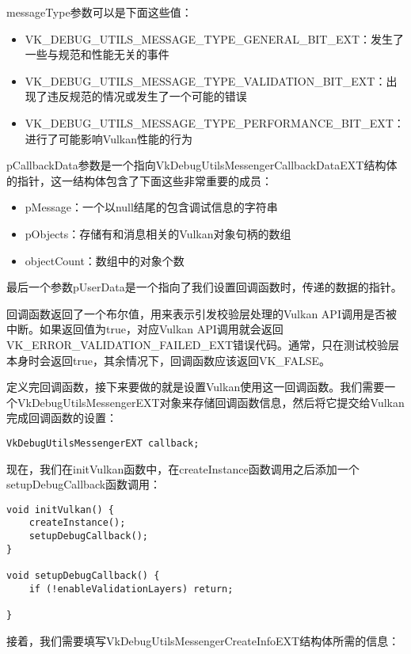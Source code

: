 messageType参数可以是下面这些值：

\begin{itemize}
	\item VK\_DEBUG\_UTILS\_MESSAGE\_TYPE\_GENERAL\_BIT\_EXT：发生了一些与规范和性能无关的事件
	\item VK\_DEBUG\_UTILS\_MESSAGE\_TYPE\_VALIDATION\_BIT\_EXT：出现了违反规范的情况或发生了一个可能的错误
	\item VK\_DEBUG\_UTILS\_MESSAGE\_TYPE\_PERFORMANCE\_BIT\_EXT：进行了可能影响Vulkan性能的行为
\end{itemize}

pCallbackData参数是一个指向VkDebugUtilsMessengerCallbackDataEXT结构体的指针，这一结构体包含了下面这些非常重要的成员：

\begin{itemize}
	\item pMessage：一个以null结尾的包含调试信息的字符串
	\item pObjects：存储有和消息相关的Vulkan对象句柄的数组
	\item objectCount：数组中的对象个数
\end{itemize}

最后一个参数pUserData是一个指向了我们设置回调函数时，传递的数据的指针。

回调函数返回了一个布尔值，用来表示引发校验层处理的Vulkan API调用是否被中断。如果返回值为true，对应Vulkan API调用就会返回VK\_ERROR\_VALIDATION\_FAILED\_EXT错误代码。通常，只在测试校验层本身时会返回true，其余情况下，回调函数应该返回VK\_FALSE。

定义完回调函数，接下来要做的就是设置Vulkan使用这一回调函数。我们需要一个VkDebugUtilsMessengerEXT对象来存储回调函数信息，然后将它提交给Vulkan完成回调函数的设置：

\begin{lstlisting}[language={[ANSI]C}]
VkDebugUtilsMessengerEXT callback;
\end{lstlisting}

现在，我们在initVulkan函数中，在createInstance函数调用之后添加一个setupDebugCallback函数调用：

\begin{lstlisting}[language={[ANSI]C}]
void initVulkan() {
	createInstance();
	setupDebugCallback();
}

void setupDebugCallback() {
	if (!enableValidationLayers) return;

}
\end{lstlisting}

接着，我们需要填写VkDebugUtilsMessengerCreateInfoEXT结构体所需的信息：

